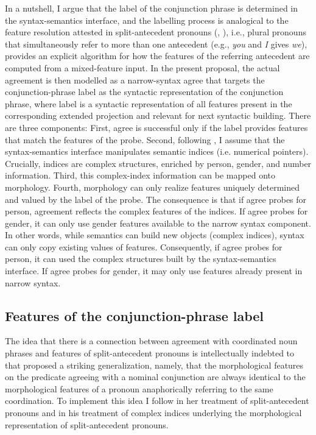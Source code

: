 \documentclass[output=paper,
modfonts
newtxmath,
hidelinks
]{langscibook}
\begin{document}
In a nutshell, I argue that the label of the conjunction phrase is determined in the syntax-semantics interface, and the labelling process is analogical to the feature resolution attested in split-antecedent pronouns (\citealt{Heim2008}, \citealt{Sudo2012}), i.e., plural pronouns that simultaneously refer to more than one antecedent (e.g., \textit{you} and \textit{I} gives \textit{we}), provides an explicit algorithm for how the features of the referring antecedent are computed from a mixed-feature input. In the present proposal, the actual agreement is then modelled as a narrow-syntax agree that targets the conjunction-phrase label as the syntactic representation of the conjunction phrase, where label is a syntactic representation of all features present in the corresponding extended projection and relevant for next syntactic building. There are three components: First, agree is successful only if the label provides features that match the features of the probe. Second, following \citet{Sudo2012}, I assume that the syntax-semantics interface manipulates semantic indices (i.e. numerical pointers). Crucially, indices are complex structures, enriched by person, gender, and number information. Third,  this complex-index information can be mapped onto morphology. Fourth, morphology can only realize features uniquely determined and valued by the label of the probe. The consequence is that if agree probes for person, agreement reflects the complex features of the indices. If agree probes for gender, it can only use gender features available to the narrow syntax component. In other words, while semantics can build new objects (complex indices), syntax can only copy existing values of features. Consequently, if agree probes for person, it can used the complex structures built by the syntax-semantics interface. If agree probes for gender, it may only use features already present in narrow syntax.

\subsection{Features of the conjunction-phrase label}

The idea that there is a connection between agreement with coordinated noun phrases and features of split-antecedent pronouns is intellectually indebted to \citet{Farkas1995} that proposed a striking generalization, namely, that the morphological features on the predicate agreeing with a nominal conjunction are always identical to the morphological features of a pronoun anaphorically referring to the same coordination. To implement this idea I follow \citet{Heim2008} in her treatment of split-antecedent pronouns and \citet{Sudo2012} in his treatment of complex indices underlying the morphological representation of split-antecedent pronouns. 
\end{document}
